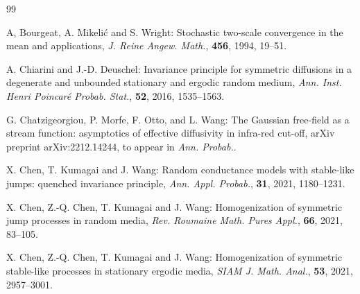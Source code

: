 \documentclass[11pt,draft, reqno]{amsart}
\theoremstyle{definition}
\numberwithin{equation}{section}
\begin{document}
\begin{thebibliography}{99}



A, Bourgeat, A. Mikeli\'{c} and S. Wright: Stochastic two-scale convergence in the mean and applications, \emph{J. Reine Angew. Math.}, {\bf 456}, 1994, 19--51.





  A. Chiarini and J.-D. Deuschel: Invariance principle for symmetric diffusions in a degenerate and unbounded stationary and ergodic random medium,
\emph{Ann. Inst. Henri Poincar\'e Probab. Stat.}, \textbf{52}, 2016,
1535--1563.


 G. Chatzigeorgiou, P. Morfe, F. Otto, and L. Wang: The Gaussian free-field as a stream function:
asymptotics of effective diffusivity in infra-red cut-off, arXiv preprint arXiv:2212.14244, to appear in \emph{Ann. Probab.}.

 X. Chen, T. Kumagai and J. Wang: Random conductance models with stable-like jumps: quenched invariance principle,
\emph{Ann. Appl. Probab.}, \textbf{31}, 2021, 1180--1231.




 X. Chen, Z.-Q. Chen, T. Kumagai and J. Wang: Homogenization of symmetric jump processes
in random media, \emph{Rev. Roumaine Math. Pures Appl.}, \textbf{66}, 2021, 83--105.

 X. Chen, Z.-Q. Chen, T. Kumagai and J. Wang: Homogenization of symmetric stable-like processes in stationary ergodic media,
\emph{SIAM J. Math. Anal.}, \textbf{53}, 2021, 2957--3001.


\end{thebibliography}
\end{document}

